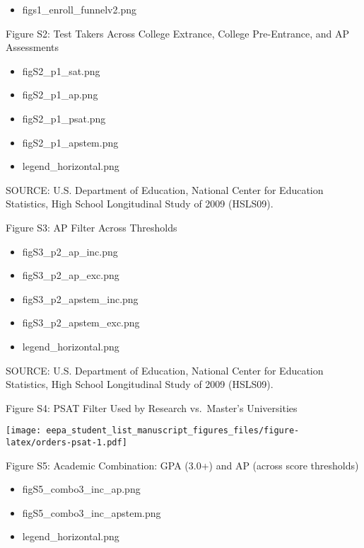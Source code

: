 \documentclass[
  12pt,
]{article}
\providecommand{\tightlist}{%
  \setlength{\itemsep}{0pt}\setlength{\parskip}{0pt}}
\begin{document}
\begin{itemize}
\tightlist
\item
  figs1\_enroll\_funnelv2.png
\end{itemize}

Figure S2: Test Takers Across College Extrance, College Pre-Entrance, and AP Assessments

\begin{itemize}
\tightlist
\item
  figS2\_p1\_sat.png
\item
  figS2\_p1\_ap.png
\item
  figS2\_p1\_psat.png
\item
  figS2\_p1\_apstem.png
\item
  legend\_horizontal.png
\end{itemize}

\begingroup
\fontsize{8}{8}\selectfont

SOURCE: U.S. Department of Education, National Center for Education Statistics, High School Longitudinal Study of 2009 (HSLS09).
\endgroup

Figure S3: AP Filter Across Thresholds

\begin{itemize}
\tightlist
\item
  figS3\_p2\_ap\_inc.png
\item
  figS3\_p2\_ap\_exc.png
\item
  figS3\_p2\_apstem\_inc.png
\item
  figS3\_p2\_apstem\_exc.png
\item
  legend\_horizontal.png
\end{itemize}

\begingroup
\fontsize{8}{8}\selectfont

SOURCE: U.S. Department of Education, National Center for Education Statistics, High School Longitudinal Study of 2009 (HSLS09).
\endgroup

\pagebreak

Figure S4: PSAT Filter Used by Research vs.~Master's Universities \newline

\texttt{[image: eepa\_student\_list\_manuscript\_figures\_files/figure-latex/orders-psat-1.pdf]}

\pagebreak

Figure S5: Academic Combination: GPA (3.0+) and AP (across score thresholds)

\begin{itemize}
\tightlist
\item
  figS5\_combo3\_inc\_ap.png
\item
  figS5\_combo3\_inc\_apstem.png
\item
  legend\_horizontal.png
\end{itemize}
\end{document}
